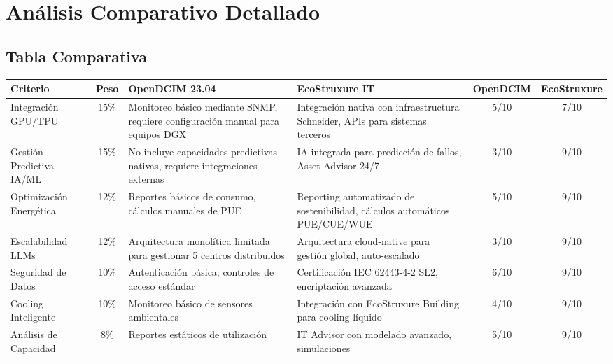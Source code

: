 \documentclass[12pt,a4paper]{article}
\begin{document}
\section{Análisis Comparativo Detallado}

\subsection{Tabla Comparativa}

\begin{longtable}{|p{3cm}|c|p{3.5cm}|p{3.5cm}|c|c|}
\hline
\textbf{Criterio} & \textbf{Peso} & \textbf{OpenDCIM 23.04} & \textbf{EcoStruxure IT} & \textbf{OpenDCIM} & \textbf{EcoStruxure} \\
\hline
\endhead

Integración GPU/TPU & 15\% & Monitoreo básico mediante SNMP, requiere configuración manual para equipos DGX & Integración nativa con infraestructura Schneider, APIs para sistemas terceros & 5/10 & 7/10 \\
\hline

Gestión Predictiva IA/ML & 15\% & No incluye capacidades predictivas nativas, requiere integraciones externas & IA integrada para predicción de fallos, Asset Advisor 24/7 & 3/10 & 9/10 \\
\hline

Optimización Energética & 12\% & Reportes básicos de consumo, cálculos manuales de PUE & Reporting automatizado de sostenibilidad, cálculos automáticos PUE/CUE/WUE & 5/10 & 9/10 \\
\hline

Escalabilidad LLMs & 12\% & Arquitectura monolítica limitada para gestionar 5 centros distribuidos & Arquitectura cloud-native para gestión global, auto-escalado & 3/10 & 9/10 \\
\hline

Seguridad de Datos & 10\% & Autenticación básica, controles de acceso estándar & Certificación IEC 62443-4-2 SL2, encriptación avanzada & 6/10 & 9/10 \\
\hline

Cooling Inteligente & 10\% & Monitoreo básico de sensores ambientales & Integración con EcoStruxure Building para cooling líquido & 4/10 & 9/10 \\
\hline

Análisis de Capacidad & 8\% & Reportes estáticos de utilización & IT Advisor con modelado avanzado, simulaciones & 5/10 & 9/10 \\
\hline


\end{longtable}
\end{document}
